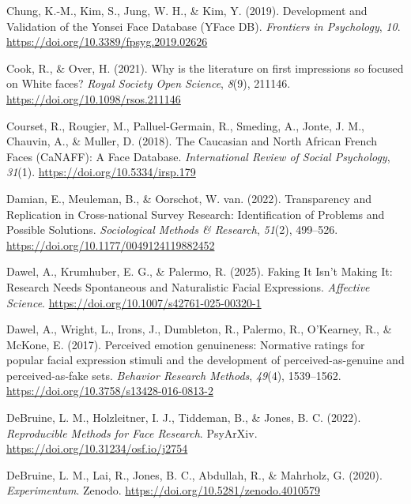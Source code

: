 \documentclass[
  letterpaper,
  DIV=11,
  numbers=noendperiod]{scrartcl}
\newlength{\cslhangindent}
\newenvironment{CSLReferences}[2] %
 {\begin{list}{}{%
  \setlength{\itemindent}{0pt}
  \setlength{\leftmargin}{0pt}
  \setlength{\parsep}{0pt}
  \ifodd #1
   \setlength{\leftmargin}{\cslhangindent}
   \setlength{\itemindent}{-1\cslhangindent}
  \fi
  \setlength{\itemsep}{#2\baselineskip}}}
 {\end{list}}
\begin{document}
\begin{CSLReferences}{1}{0}
Chung, K.-M., Kim, S., Jung, W. H., \& Kim, Y. (2019). Development and
{Validation} of the {Yonsei} {Face} {Database} ({YFace} {DB}).
\emph{Frontiers in Psychology}, \emph{10}.
\url{https://doi.org/10.3389/fpsyg.2019.02626}

Cook, R., \& Over, H. (2021). Why is the literature on first impressions
so focused on {White} faces? \emph{Royal Society Open Science},
\emph{8}(9), 211146. \url{https://doi.org/10.1098/rsos.211146}

Courset, R., Rougier, M., Palluel-Germain, R., Smeding, A., Jonte, J.
M., Chauvin, A., \& Muller, D. (2018). The {Caucasian} and {North}
{African} {French} {Faces} ({CaNAFF}): {A} {Face} {Database}.
\emph{International Review of Social Psychology}, \emph{31}(1).
\url{https://doi.org/10.5334/irsp.179}

Damian, E., Meuleman, B., \& Oorschot, W. van. (2022). Transparency and
{Replication} in {Cross}-national {Survey} {Research}: {Identification}
of {Problems} and {Possible} {Solutions}. \emph{Sociological Methods \&
Research}, \emph{51}(2), 499--526.
\url{https://doi.org/10.1177/0049124119882452}

Dawel, A., Krumhuber, E. G., \& Palermo, R. (2025). Faking {It} {Isn}'t
{Making} {It}: {Research} {Needs} {Spontaneous} and {Naturalistic}
{Facial} {Expressions}. \emph{Affective Science}.
\url{https://doi.org/10.1007/s42761-025-00320-1}

Dawel, A., Wright, L., Irons, J., Dumbleton, R., Palermo, R., O'Kearney,
R., \& McKone, E. (2017). Perceived emotion genuineness: Normative
ratings for popular facial expression stimuli and the development of
perceived-as-genuine and perceived-as-fake sets. \emph{Behavior Research
Methods}, \emph{49}(4), 1539--1562.
\url{https://doi.org/10.3758/s13428-016-0813-2}

DeBruine, L. M., Holzleitner, I. J., Tiddeman, B., \& Jones, B. C.
(2022). \emph{Reproducible {Methods} for {Face} {Research}}. PsyArXiv.
\url{https://doi.org/10.31234/osf.io/j2754}

DeBruine, L. M., Lai, R., Jones, B. C., Abdullah, R., \& Mahrholz, G.
(2020). \emph{Experimentum}. Zenodo.
\url{https://doi.org/10.5281/zenodo.4010579}


\end{CSLReferences}
\end{document}
